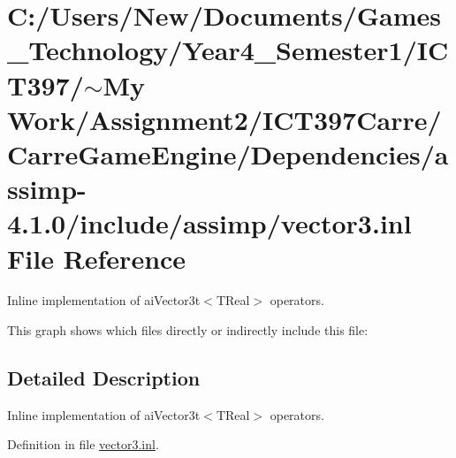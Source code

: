 \hypertarget{vector3_8inl}{
\section{C:/Users/New/Documents/Games\_\-Technology/Year4\_\-Semester1/ICT397/$\sim$My Work/Assignment2/ICT397Carre/CarreGameEngine/Dependencies/assimp-4.1.0/include/assimp/vector3.inl File Reference}
\label{vector3_8inl}
}
Inline implementation of aiVector3t$<$TReal$>$ operators. 



This graph shows which files directly or indirectly include this file:

\subsection{Detailed Description}
Inline implementation of aiVector3t$<$TReal$>$ operators. 



Definition in file \hyperlink{vector3_8inl-source}{vector3.inl}.